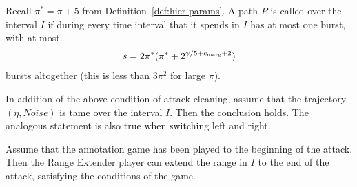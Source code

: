 \documentclass[11pt]{memoir}
\theoremstyle{definition} %
\newcommand{\Noise}{\mathit{Noise}}
\newcommand{\passno}{\pi}
\newcommand{\s}{s} %
\newcommand{\cns}[1]{c_{\textrm{\upshape #1}}}
\newcommand{\CMarg}{\cns{marg}}
\begin{document}
\begin{definition}\label{def:tame}
  Recall \( \passno^{*}=\passno + 5 \) from Definition~\ref{def:hier-params}.
   A path \( P \) is called  over the interval \( I \) if
   during every time interval that it spends in \( I \) has at most one burst,
   with at most
\begin{align}\label{eq:s-def}
  \s=  2\passno^{*}(\passno^{*}+2^{\gamma/5+\CMarg + 2})
\end{align}
   bursts altogether (this is less than \( 3\passno^{2} \) for large \( \passno \)).
 \end{definition}

 \begin{lemma}\label{lem:weak-attack-clean}
   \begin{alphenum}
     \item
   In addition of the above condition of attack cleaning,
   assume that the trajectory \( (\eta,\Noise) \) is tame over the interval \( I \).
   Then the conclusion holds.
   The analogous statement is also true when switching left and right.
   
 \item\label{i:weak-attack-clean.game}
   Assume that the annotation game has been played to the beginning of the attack.
   Then the Range Extender player can extend the range in \( I \) to the end of the attack,
   satisfying the conditions of the game.     
   \end{alphenum}
\end{lemma}
\end{document}
